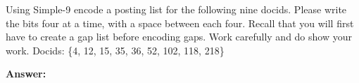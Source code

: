 \documentclass[11pt]{article}
\begin{document}
\begin{enumerate}
        Using Simple-9 encode a posting list for the following nine docids. Please write the bits four at a time, with a space between each four. Recall that you will first have to create a gap list before encoding gaps. Work carefully and do show your work. Docids: \{4, 12, 15, 35, 36, 52, 102, 118, 218\}

        \textbf{Answer:}

    \end{enumerate}
\end{document}
